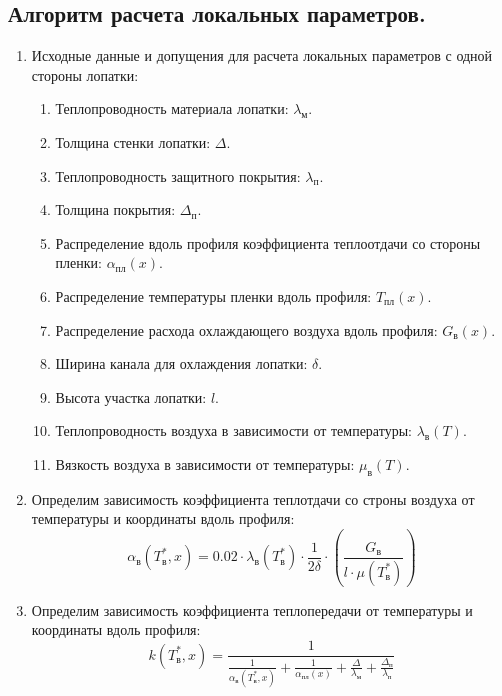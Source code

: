 \documentclass[a4paper,10pt]{article}
\begin{document}

    \subsection{Алгоритм расчета локальных параметров.}

    

    \begin{enumerate}

        \item Исходные данные и допущения для расчета локальных параметров с одной стороны лопатки:

        \begin{enumerate}
            \item Теплопроводность материала лопатки: $\lambda_м$.
            \item Толщина стенки лопатки: $\Delta$.
            \item Теплопроводность защитного покрытия: $\lambda_п$.
            \item Толщина покрытия: $\Delta_п$.
            \item Распределение вдоль профиля коэффициента теплоотдачи со стороны пленки: $\alpha_{пл} (x)$.
            \item Распределение температуры пленки вдоль профиля: $T_{пл} (x)$.
            \item Распределение расхода охлаждающего воздуха вдоль профиля: $G_в (x)$.
            \item Ширина канала для охлаждения лопатки: $\delta$.
            \item Высота участка лопатки: $l$.
            \item Теплопроводность воздуха в зависимости от температуры: $\lambda_в (T)$.
            \item Вязкость воздуха в зависимости от температуры: $\mu_в (T)$.
        \end{enumerate}

        \item Определим зависимость коэффициента теплотдачи со строны воздуха от температуры и координаты вдоль профиля:
        \[
            \alpha_в(T_в^*, x) = 0.02 \cdot \lambda_в \left( T_в^* \right) \cdot \frac{1}{2 \delta} \cdot
                \left(
                \frac{G_в }{l \cdot \mu \left( T_в^* \right)}
            \right)
        \]

        \item Определим зависимость коэффициента теплопередачи от температуры и координаты вдоль профиля:
        \[
            k (T_в^*, x) = \frac{1
                    }{
                \frac{1}{\alpha_в(T_в^*, x)} + \frac{1}{\alpha_{пл} (x)} + \frac{\Delta}{\lambda_м} +
                \frac{\Delta_п}{\lambda_п}
            }
        \]


\end{enumerate}
\end{document}
